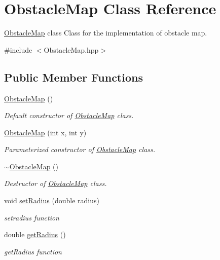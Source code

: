 \hypertarget{class_obstacle_map}{}\section{Obstacle\+Map Class Reference}
\label{class_obstacle_map}


\hyperlink{class_obstacle_map}{Obstacle\+Map} class Class for the implementation of obstacle map.  




{\ttfamily \#include $<$Obstacle\+Map.\+hpp$>$}

\subsection*{Public Member Functions}
\begin{DoxyCompactItemize}
\item 
\hyperlink{class_obstacle_map_adad91248cb403d70be14d6a455585a26}{Obstacle\+Map} ()
\begin{DoxyCompactList}\small\item\em Default constructor of \hyperlink{class_obstacle_map}{Obstacle\+Map} class. \end{DoxyCompactList}\item 
\hyperlink{class_obstacle_map_aceecca97376bb67939a8acca45ef28c2}{Obstacle\+Map} (int x, int y)
\begin{DoxyCompactList}\small\item\em Parameterized constructor of \hyperlink{class_obstacle_map}{Obstacle\+Map} class. \end{DoxyCompactList}\item 
\hyperlink{class_obstacle_map_a3165621713b03258d80d44bc00599579}{$\sim$\+Obstacle\+Map} ()
\begin{DoxyCompactList}\small\item\em Destructor of \hyperlink{class_obstacle_map}{Obstacle\+Map} class. \end{DoxyCompactList}\item 
void \hyperlink{class_obstacle_map_a5eca9b21b7fed6df0e69efca4750888b}{set\+Radius} (double radius)
\begin{DoxyCompactList}\small\item\em setradius function \end{DoxyCompactList}\item 
double \hyperlink{class_obstacle_map_ada9f00b4a5b6ed9a15125782ddaf94c8}{get\+Radius} ()
\begin{DoxyCompactList}\small\item\em get\+Radius function \end{DoxyCompactList}\item 

\end{DoxyCompactItemize}
